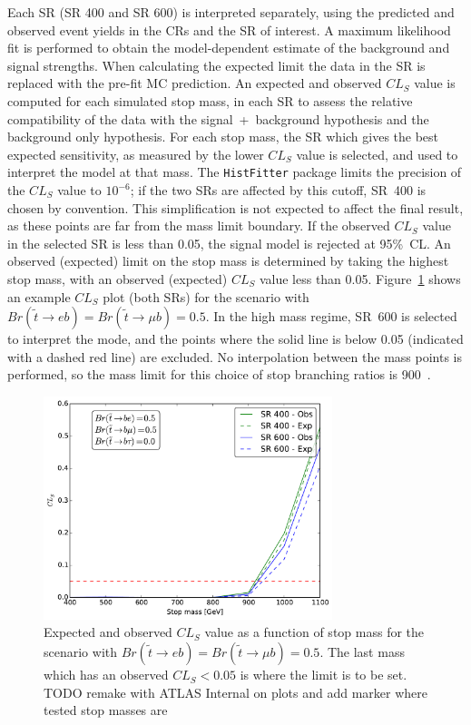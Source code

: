 Each SR (SR 400 and SR 600) is interpreted separately, using the predicted and
observed event yields in the CRs and the SR of interest.
A maximum likelihood fit is performed to obtain the model-dependent estimate of
the background and signal strengths.
When calculating the expected limit the data in the SR is replaced with the
pre-fit MC prediction.
An expected and observed $CL_S$ value is computed for each simulated stop mass,
in each SR to assess the relative compatibility of the data with the
signal~+~background hypothesis and the background only hypothesis.
For each stop mass, the SR which gives the best expected sensitivity, as
measured by the lower $CL_S$ value is selected, and used to interpret the model
at that mass.
The \texttt{HistFitter} package limits the precision of the $CL_S$ value
to $10^{-6}$; if the two SRs are affected by this cutoff, SR~400 is chosen by
convention.
This simplification is not expected to affect the final result, as these points
are far from the mass limit boundary.
If the observed $CL_S$ value in the selected SR is less than 0.05, the signal
model is rejected at 95\%~CL.
An observed (expected) limit on the stop mass is determined by taking the
highest stop mass, with an observed (expected) $CL_S$ value less than 0.05.
Figure~\ref{fig:exp_limit_br_5050} shows an example $CL_S$ plot (both SRs)
for the scenario with $Br(\tilde{t} \to eb) = Br(\tilde{t} \to \mu b) = 0.5$.
In the high mass regime, SR~600 is selected to interpret the mode, and
the points where the solid line is below 0.05 (indicated with a dashed red line)
are excluded.
No interpolation between the mass points is performed, so the mass limit for
this choice of stop branching ratios is 900~\GeV.

\begin{figure}[t]
  \centering
  \includegraphics[width=0.75\textwidth]{figs/blstop/cls_plots/cls_vs_m_br_e_50_br_m_50_br_t_0.pdf}
  \caption{Expected and observed $CL_S$ value as a function of stop mass for
    the scenario with $Br(\tilde{t} \to eb) = Br(\tilde{t} \to \mu b) = 0.5$.
    The last mass which has an observed $CL_S < 0.05$ is where the limit is to
    be set.
    {\color{red} TODO remake with ATLAS Internal on plots and add marker where
    tested stop masses are}
  }
  \label{fig:exp_limit_br_5050}
\end{figure}

